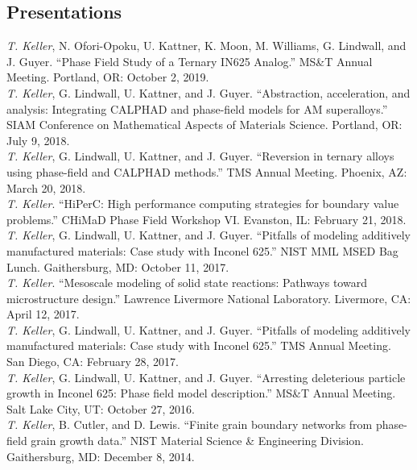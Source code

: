 \documentclass[margin]{res}
\begin{document}
\begin{resume}
\section{Presentations}
\emph{T. Keller}, N. Ofori-Opoku, U. Kattner, K. Moon, M. Williams, G. Lindwall, and J. Guyer. ``Phase Field Study of a Ternary IN625 Analog.''
 MS\&T Annual Meeting. Portland, OR: October 2, 2019.\\[0.25\baselineskip]
\baselineskip
\emph{T. Keller}, G. Lindwall, U. Kattner, and J. Guyer. ``Abstraction, acceleration, and analysis: Integrating CALPHAD and phase-field models for AM superalloys.''
 SIAM Conference on Mathematical Aspects of Materials Science. Portland, OR: July 9, 2018.\\[0.25\baselineskip]
\emph{T. Keller}, G. Lindwall, U. Kattner, and J. Guyer. ``Reversion in ternary alloys using phase-field and CALPHAD methods.''
 TMS Annual Meeting. Phoenix, AZ: March 20, 2018.\\[0.25\baselineskip]
\emph{T. Keller}. ``HiPerC: High performance computing strategies for boundary value problems.''
 CHiMaD Phase Field Workshop VI. Evanston, IL: February 21, 2018.\\[0.25\baselineskip]
\baselineskip
\emph{T. Keller}, G. Lindwall, U. Kattner, and J. Guyer. ``Pitfalls of modeling additively manufactured materials: Case study with Inconel 625.''
 NIST MML MSED Bag Lunch. Gaithersburg, MD: October 11, 2017.\\[0.25\baselineskip]
\emph{T. Keller}. ``Mesoscale modeling of solid state reactions: Pathways toward microstructure design.''
 Lawrence Livermore National Laboratory. Livermore, CA: April 12, 2017.\\[0.25\baselineskip]
\emph{T. Keller}, G. Lindwall, U. Kattner, and J. Guyer. ``Pitfalls of modeling additively manufactured materials: Case study with Inconel 625.''
 TMS Annual Meeting. San Diego, CA: February 28, 2017.\\[0.25\baselineskip]
\baselineskip
\emph{T. Keller}, G. Lindwall, U. Kattner, and J. Guyer. ``Arresting deleterious particle growth in Inconel 625: Phase field model description.''
 MS\&T Annual Meeting. Salt Lake City, UT: October 27, 2016.\\[0.25\baselineskip]
\baselineskip
\emph{T. Keller}, B. Cutler, and D. Lewis. ``Finite grain boundary networks from phase-field grain growth data.''
 NIST Material Science \& Engineering Division. Gaithersburg, MD: December 8, 2014.\\[0.25\baselineskip]

\end{resume}
\end{document}
